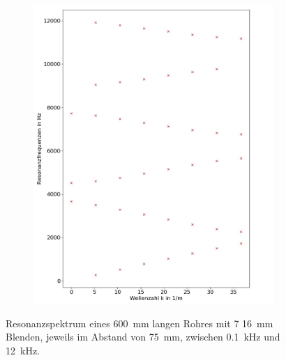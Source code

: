 \begin{figure}
\begin{subfigure}{0.34\textwidth}
\includegraphics[width=\textwidth]{content/Scripts/4_5_red.jpg}
\end{subfigure}
\caption{Resonanzspektrum eines 600~mm langen Rohres mit 7 16~mm Blenden, jeweils im Abstand von 75~mm, zwischen 0.1~kHz und 12~kHz.}
\label{fig:4_5}
\end{figure}

